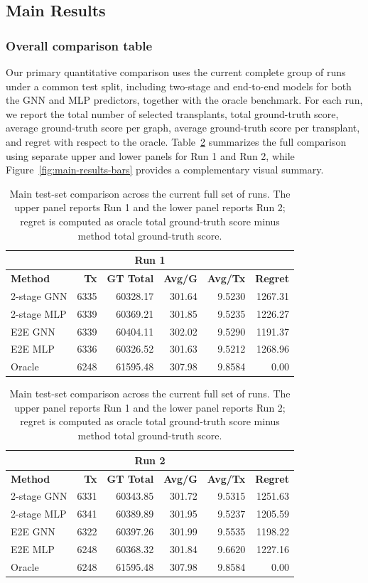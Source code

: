 \documentclass{article}
\begin{document}
\subsection{Main Results}
\subsubsection{Overall comparison table}
Our primary quantitative comparison uses the current complete group of runs under a common test split, including two-stage and end-to-end models for both the GNN and MLP predictors, together with the oracle benchmark. For each run, we report the total number of selected transplants, total ground-truth score, average ground-truth score per graph, average ground-truth score per transplant, and regret with respect to the oracle. Table~\ref{tab:main-results} summarizes the full comparison using separate upper and lower panels for Run 1 and Run 2, while Figure~\ref{fig:main-results-bars} provides a complementary visual summary.

\begin{table}[H]
\centering
\small
\setlength{\tabcolsep}{4pt}
\caption{Main test-set comparison across the current full set of runs. The upper panel reports Run 1 and the lower panel reports Run 2; regret is computed as oracle total ground-truth score minus method total ground-truth score.}
\label{tab:main-results}
\begin{tabular}{@{}lrrrrr@{}}
\toprule
\multicolumn{6}{c}{\textbf{Run 1}} \\
\midrule
\textbf{Method} & \textbf{Tx} & \textbf{GT Total} & \textbf{Avg/G} & \textbf{Avg/Tx} & \textbf{Regret} \\
\midrule
2-stage GNN & 6335 & 60328.17 & 301.64 & 9.5230 & 1267.31 \\
2-stage MLP & 6339 & 60369.21 & 301.85 & 9.5235 & 1226.27 \\
E2E GNN & 6339 & 60404.11 & 302.02 & 9.5290 & 1191.37 \\
E2E MLP & 6336 & 60326.52 & 301.63 & 9.5212 & 1268.96 \\
Oracle & 6248 & 61595.48 & 307.98 & 9.8584 & 0.00 \\
\bottomrule
\end{tabular}

\vspace{0.75em}

\begin{tabular}{@{}lrrrrr@{}}
\toprule
\multicolumn{6}{c}{\textbf{Run 2}} \\
\midrule
\textbf{Method} & \textbf{Tx} & \textbf{GT Total} & \textbf{Avg/G} & \textbf{Avg/Tx} & \textbf{Regret} \\
\midrule
2-stage GNN & 6331 & 60343.85 & 301.72 & 9.5315 & 1251.63 \\
2-stage MLP & 6341 & 60389.89 & 301.95 & 9.5237 & 1205.59 \\
E2E GNN & 6322 & 60397.26 & 301.99 & 9.5535 & 1198.22 \\
E2E MLP & 6248 & 60368.32 & 301.84 & 9.6620 & 1227.16 \\
Oracle & 6248 & 61595.48 & 307.98 & 9.8584 & 0.00 \\
\bottomrule
\end{tabular}
\end{table}
\end{document}
